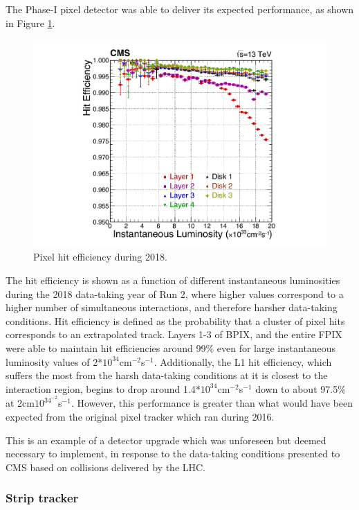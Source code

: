 The Phase-I pixel detector was able to deliver its expected performance, as shown in Figure \ref{fig:PIX_HitEfficiency}. 

\begin{figure}[H]
    \centering
    \includegraphics[width=\textwidth]{Images/CMS/Tracker/Pixel_HitEfficiency.pdf}
    \caption{Pixel hit efficiency during 2018.}
    \label{fig:PIX_HitEfficiency}
\end{figure}

The hit efficiency is shown as a function of different instantaneous luminosities during the 2018 data-taking year of Run 2, where higher values correspond to a higher number of simultaneous interactions, and therefore harsher data-taking conditions. Hit efficiency is defined as the probability that a cluster of pixel hits corresponds to an extrapolated track. Layers 1-3 of BPIX, and the entire FPIX were able to maintain hit efficiencies around 99\% even for large instantaneous luminosity values of 2*$ 10^{34}$cm$^{-2}$s$^{-1}$. Additionally, the L1 hit efficiency, which suffers the most from the harsh data-taking conditions at it is closest to the interaction region, begins to drop around 1.4*$10^{34}$cm$^{-2}$s$^{-1}$ down to about 97.5\% at 2cm$10^{34}^{-2}$s$^{-1}$. However, this performance is greater than what would have been expected from the original pixel tracker which ran during 2016. 

This is an example of a detector upgrade which was unforeseen but deemed necessary to implement, in response to the data-taking conditions presented to CMS based on collisions delivered by the LHC.

\subsubsection{Strip tracker}

